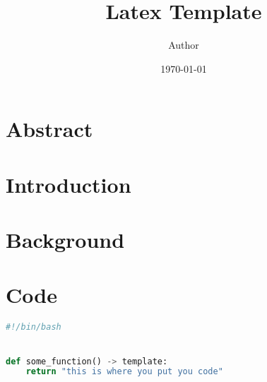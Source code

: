 \documentclass{article}
\title{Latex Template}
\author{Author}
\date{\today}
\begin{document}
\maketitle

\section*{Abstract}

\newpage

\section{Introduction}


\section{Background}


\newpage



\newpage
\appendix
\section{Code}
\begin{lstlisting}[language=Python, label=appendix:python_example, caption={\raggedright Code Listing.}]
#!/bin/bash


def some_function() -> template:
    return "this is where you put you code"

\end{lstlisting}
\end{document}
